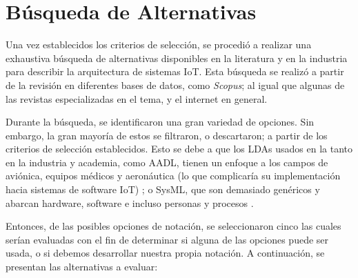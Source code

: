 \section{Búsqueda de Alternativas}

Una vez establecidos los criterios de selección, se procedió a realizar una exhaustiva búsqueda de alternativas disponibles en la literatura y en la industria para describir la arquitectura de sistemas IoT. Esta búsqueda se realizó a partir de la revisión en diferentes bases de datos, como \textit{Scopus}; al igual que algunas de las revistas especializadas en el tema, y el internet en general.

Durante la búsqueda, se identificaron una gran variedad de opciones. Sin embargo, la gran mayoría de estos se filtraron, o descartaron; a partir de los criterios de selección establecidos. Esto se debe a que los LDAs usados en la tanto en la industria y academia, como AADL, tienen un enfoque a los campos de aviónica, equipos médicos y aeronáutica (lo que complicaría su implementación hacia sistemas de software IoT) \cite{aadl_web, aadl_pdf}; o SysML, que son demasiado genéricos y abarcan hardware, software e incluso personas y procesos \cite{omgsysml_2015}.

Entonces, de las posibles opciones de notación, se seleccionaron cinco las cuales serían evaluadas con el fin de determinar si alguna de las opciones puede ser usada, o si debemos desarrollar nuestra propia notación. A continuación, se presentan las alternativas a evaluar:


